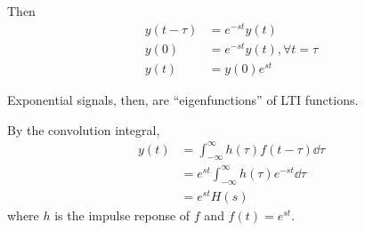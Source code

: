 \documentclass[12pt]{article}
\begin{document}
Then
\begin{align*}
y(t-\tau) &= e^{-st}y(t) \\
y(0) &= e^{-st} y(t), \forall t = \tau \\
y(t) &= y(0)e^{st}
\end{align*}

Exponential signals, then, are ``eigenfunctions'' of LTI functions.

By the convolution integral,
\begin{align*}
y(t) &= \int_{-\infty}^\infty h(\tau) f(t-\tau) \dd\tau \\
&= e^{st} \int_{-\infty}^\infty h(\tau) e^{-st} \dd\tau \\
&= e^{st} H(s)
\end{align*}
where $h$ is the impulse reponse of $f$ and $f(t) = e^{st}$.
\end{document}
